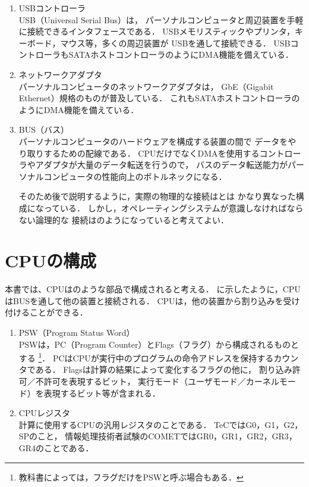 \begin{enumerate}
\item USBコントローラ \\
USB（Universal Serial Bus）は，
パーソナルコンピュータと周辺装置を手軽に接続できるインタフェースである．
USBメモリスティックやプリンタ，キーボード，マウス等，多くの周辺装置が
USBを通して接続できる．
USBコントローラもSATAホストコントローラのようにDMA機能を備えている．

\item ネットワークアダプタ \\
パーソナルコンピュータのネットワークアダプタは，
GbE（Gigabit Ethernet）規格のものが普及している．
これもSATAホストコントローラのようにDMA機能を備えている．

\item BUS（バス） \\
パーソナルコンピュータのハードウェアを構成する装置の間で
データをやり取りするための配線である．
CPUだけでなくDMAを使用するコントローラやアダプタが大量のデータ転送を行うので，
バスのデータ転送能力がパーソナルコンピュータの性能向上のボトルネックになる．

そのため後で説明するように，実際の物理的な接続はとは
かなり異なった構成になっている．
しかし，オペレーティングシステムが意識しなければならない論理的な
接続はのようになっていると考えてよい．

\end{enumerate}

\section{CPUの構成}
本書では、CPUはのような部品で構成されると考える．
に示したように，CPUはBUSを通して他の装置と接続される．
CPUは，他の装置から割り込みを受け付けることができる．


\begin{enumerate}
\item PSW（Program Status Word） \\
PSWは，PC（Program Counter）とFlags（フラグ）から構成されるものとする
\footnote{
教科書によっては，フラグだけをPSWと呼ぶ場合もある．}．
PCはCPUが実行中のプログラムの命令アドレスを保持するカウンタである．
Flagsは計算の結果によって変化するフラグの他に，
割り込み許可／不許可を表現するビット，
実行モード（ユーザモード／カーネルモード）を表現するビット等が含まれる．

\item CPUレジスタ \\
計算に使用するCPUの汎用レジスタのことである．
TeCではG0，G1，G2，SPのこと，
情報処理技術者試験のCOMETではGR0，GR1，GR2，GR3，GR4のことである．

\end{enumerate}

